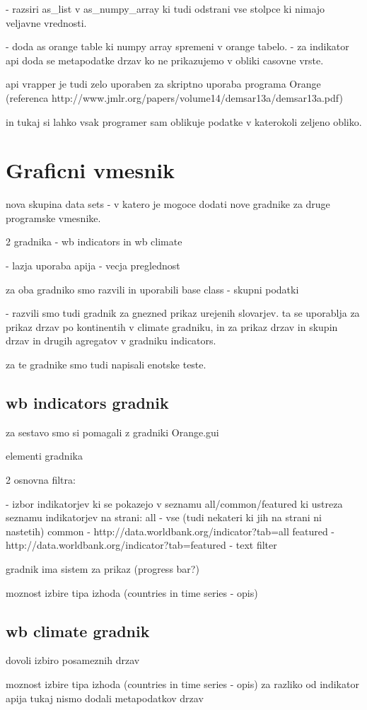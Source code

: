 - razsiri as\_list v as\_numpy\_array ki tudi odstrani vse stolpce ki nimajo 
  veljavne vrednosti.

- doda as orange table ki numpy array spremeni v orange tabelo.
  - za indikator api doda se metapodatke drzav ko ne prikazujemo v obliki casovne vrste.


api vrapper je tudi zelo uporaben za skriptno uporaba programa Orange 
(referenca http://www.jmlr.org/papers/volume14/demsar13a/demsar13a.pdf)

in tukaj si lahko vsak programer sam oblikuje podatke v katerokoli zeljeno obliko.






\section{Graficni vmesnik}

 
nova skupina data sets 
 - v katero je mogoce dodati nove gradnike za druge programske vmesnike.

2 gradnika - wb indicators in wb climate

- lazja uporaba apija
- vecja preglednost


za oba gradniko smo razvili in uporabili base class - skupni podatki

- razvili smo tudi gradnik za gnezned prikaz urejenih slovarjev.
  ta se uporablja za prikaz drzav po kontinentih v climate gradniku,
  in za prikaz drzav in skupin drzav in drugih agregatov v gradniku
  indicators.


za te gradnike smo tudi napisali enotske teste.



\subsection{wb indicators gradnik}

za sestavo smo si pomagali z gradniki Orange.gui 

elementi gradnika

2 osnovna filtra: 

- izbor indikatorjev ki se pokazejo v seznamu all/common/featured 
  ki ustreza seznamu indikatorjev na strani: 
  all - vse (tudi nekateri ki jih na strani ni nastetih)
  common - http://data.worldbank.org/indicator?tab=all
  featured - http://data.worldbank.org/indicator?tab=featured
- text filter

gradnik ima sistem za prikaz (progress bar?) 

moznost izbire tipa izhoda (countries in time series - opis)



\subsection{wb climate gradnik}

dovoli izbiro posameznih drzav 

moznost izbire tipa izhoda (countries in time series - opis)
za razliko od indikator apija tukaj nismo dodali metapodatkov drzav 


